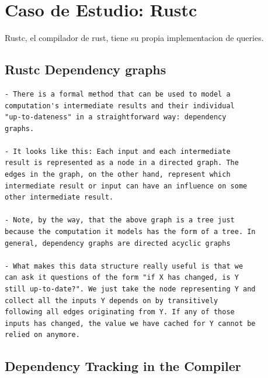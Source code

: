 \documentclass[12pt, a4paper]{report}
\begin{document}
\section*{Caso de Estudio: Rustc}

Rustc, el compilador de rust, tiene su propia implementacion de queries.

\subsection*{Rustc Dependency graphs}

\begin{verbatim}
- There is a formal method that can be used to model a
computation's intermediate results and their individual
"up-to-dateness" in a straightforward way: dependency
graphs.

- It looks like this: Each input and each intermediate
result is represented as a node in a directed graph. The
edges in the graph, on the other hand, represent which
intermediate result or input can have an influence on some
other intermediate result.

- Note, by the way, that the above graph is a tree just
because the computation it models has the form of a tree. In
general, dependency graphs are directed acyclic graphs

- What makes this data structure really useful is that we
can ask it questions of the form "if X has changed, is Y
still up-to-date?". We just take the node representing Y and
collect all the inputs Y depends on by transitively
following all edges originating from Y. If any of those
inputs has changed, the value we have cached for Y cannot be
relied on anymore.
\end{verbatim}
\cite{rust_blog_incremental_compilation}

\subsection*{Dependency Tracking in the Compiler}
\end{document}
